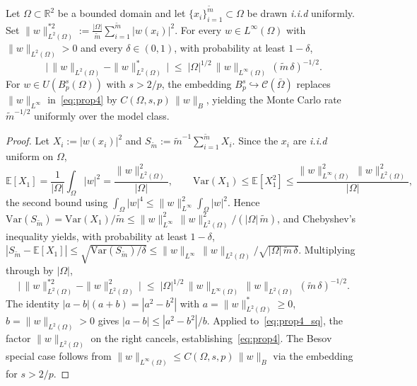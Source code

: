 \documentclass[10pt,a4paper]{amsart}
\newcommand{\C}{\mathcal{C}}
\begin{document}
\begin{proposition}\label{prop:l2_rejection}
Let $\Omega\subset\mathbb{R}^2$ be a bounded domain and let
$\{x_i\}_{i=1}^{\tilde m}\subset\Omega$ be drawn {\em i.i.d} uniformly.
Set $\|w\|^{*2}_{L^2(\Omega)} := \tfrac{|\Omega|}{\tilde m}
\sum_{i=1}^{\tilde m}|w(x_i)|^2$.
For every $w\in L^\infty(\Omega)$ with $\|w\|_{L^2(\Omega)}>0$ and
every $\delta\in(0,1)$, with probability at least $1-\delta$,
\begin{equation}\label{eq:prop4}
  \bigl|\,\|w\|_{L^2(\Omega)} - \|w\|^*_{L^2(\Omega)}\,\bigr|
  \;\le\; |\Omega|^{1/2}\,\|w\|_{L^\infty(\Omega)}\,(\tilde m\,\delta)^{-1/2}.
\end{equation}
For $w \in U(B^s_p(\Omega))$ with $s > 2/p$, the embedding
$B^s_p \hookrightarrow \C(\bar\Omega)$ replaces $\|w\|_{L^\infty}$
in~\eqref{eq:prop4} by $C(\Omega,s,p)\,\|w\|_B$, yielding the Monte
Carlo rate $\tilde m^{-1/2}$ uniformly over the model class.
\end{proposition}

\begin{proof}
Let $X_i := |w(x_i)|^2$ and $S_{\tilde m} := \tilde m^{-1}\sum_{i=1}^{\tilde m} X_i$.
Since the $x_i$ are {\em i.i.d} uniform on $\Omega$,
\[
  \mathbb{E}[X_1]
  = \frac{1}{|\Omega|}\int_\Omega|w|^2
  = \frac{\|w\|^2_{L^2(\Omega)}}{|\Omega|},
  \qquad
  \mathrm{Var}(X_1)
  \le \mathbb{E}[X_1^2]
  \le \frac{\|w\|^2_{L^\infty(\Omega)}\,\|w\|^2_{L^2(\Omega)}}{|\Omega|},
\]
the second bound using
$\int_\Omega|w|^4\le\|w\|^2_{L^\infty}\int_\Omega|w|^2$. Hence
$\mathrm{Var}(S_{\tilde m})=\mathrm{Var}(X_1)/\tilde m\le
\|w\|^2_{L^\infty}\,\|w\|^2_{L^2(\Omega)}/(|\Omega|\,\tilde m)$, and
Chebyshev's inequality yields, with probability at least $1-\delta$,
$|S_{\tilde m}-\mathbb{E}[X_1]|\le
\sqrt{\mathrm{Var}(S_{\tilde m})/\delta}\le
\|w\|_{L^\infty}\,\|w\|_{L^2(\Omega)}/\sqrt{|\Omega|\,\tilde m\,\delta}$.
Multiplying through by $|\Omega|$,
\begin{equation}\label{eq:prop4_sq}
  \bigl|\,\|w\|^{*2}_{L^2(\Omega)} - \|w\|^2_{L^2(\Omega)}\,\bigr|
  \;\le\; |\Omega|^{1/2}\,\|w\|_{L^\infty(\Omega)}\,\|w\|_{L^2(\Omega)}\,
          (\tilde m\,\delta)^{-1/2}.
\end{equation}
The identity $|a-b|(a+b) = |a^2-b^2|$ with
$a = \|w\|^*_{L^2(\Omega)} \ge 0$, $b = \|w\|_{L^2(\Omega)} > 0$ gives
$|a-b| \le |a^2-b^2|/b$. Applied to~\eqref{eq:prop4_sq}, the factor
$\|w\|_{L^2(\Omega)}$ on the right cancels, establishing~\eqref{eq:prop4}.
The Besov special case follows from $\|w\|_{L^\infty(\Omega)} \le
C(\Omega,s,p)\,\|w\|_B$ via the embedding for $s>2/p$.
\end{proof}
\end{document}
